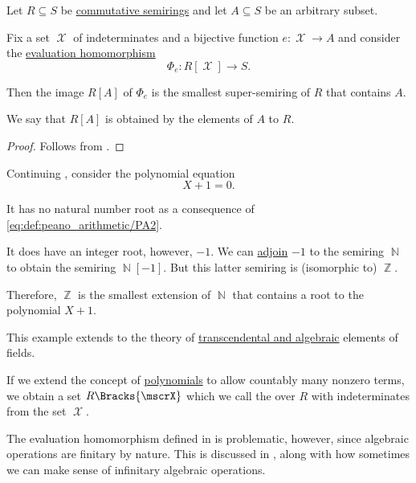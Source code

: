 \begin{proposition}\label{thm:adjoining_elements_to_semiring}
  Let \( R \subseteq S \) be \hyperref[def:semiring/commutative]{commutative semirings} and let \( A \subseteq S \) be an arbitrary subset.

  Fix a set \( \mscrX \) of indeterminates and a bijective function \( e: \mscrX \to A \) and consider the \hyperref[thm:polynomial_algebra_universal_property]{evaluation homomorphism}
  \begin{equation*}
    \Phi_e: R[\mscrX] \to S.
  \end{equation*}

  Then the image \( R[A] \) of \( \Phi_e \) is the smallest super-semiring of \( R \) that contains \( A \).

  We say that \( R[A] \) is obtained by  the elements of \( A \) to \( R \).
\end{proposition}
\begin{proof}
  Follows from .
\end{proof}

\begin{example}\label{ex:adjoining_root}
  Continuing , consider the polynomial equation
  \begin{equation*}
    X + 1 = 0.
  \end{equation*}

  It has no natural number root as a consequence of \eqref{eq:def:peano_arithmetic/PA2}.

  It does have an integer root, however, \( -1 \). We can \hyperref[thm:adjoining_elements_to_semiring]{adjoin} \( -1 \) to the semiring \( \BbbN \) to obtain the semiring \( \BbbN[-1] \). But this latter semiring is (isomorphic to) \( \BbbZ \).

  Therefore, \( \BbbZ \) is the smallest extension of \( \BbbN \) that contains a root to the polynomial \( X + 1 \).

  This example extends to the theory of \hyperref[def:transcendental_element]{transcendental and algebraic} elements of fields.
\end{example}

\begin{definition}\label{def:formal_power_series}\mimprovised
  If we extend the concept of \hyperref[def:polynomial_algebra]{polynomials} to allow countably many nonzero terms, we obtain a set \( R\Bracks{\mscrX} \) which we call the  over \( R \) with indeterminates from the set \( \mscrX \).

  The evaluation homomorphism defined in  is problematic, however, since algebraic operations are finitary by nature. This is discussed in , along with how sometimes we can make sense of infinitary algebraic operations.
\end{definition}

